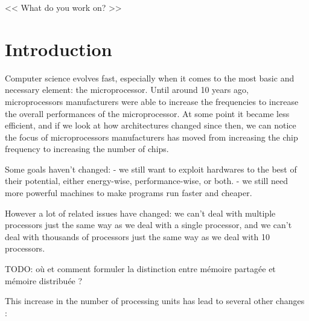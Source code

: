 \begin{savequote}[6cm]
<< What do you work on?  >>
\end{savequote}
\chapter{Introduction}
\chaptertoc

Computer science evolves fast, especially when it comes to the most basic and necessary element: the microprocessor.
Until around 10 years ago, microprocessors manufacturers were able to increase the frequencies to increase the overall performances of the microprocessor.
At some point it became less efficient, and if we look at how architectures changed since then, we can notice the focus of microprocessors manufacturers has moved from increasing the chip frequency to increasing the number of chips.

Some goals haven't changed:
 - we still want to exploit hardwares to the best of their potential, either energy-wise, performance-wise, or both.
 - we still need more powerful machines to make programs run faster and cheaper.

However a lot of related issues have changed: we can't deal with multiple processors just the same way as we deal with a single processor, and we can't deal with thousands of processors just the same way as we deal with 10 processors.

TODO: où et comment formuler la distinction entre mémoire partagée et mémoire distribuée ?

This increase in the number of processing units has lead to several other changes :

